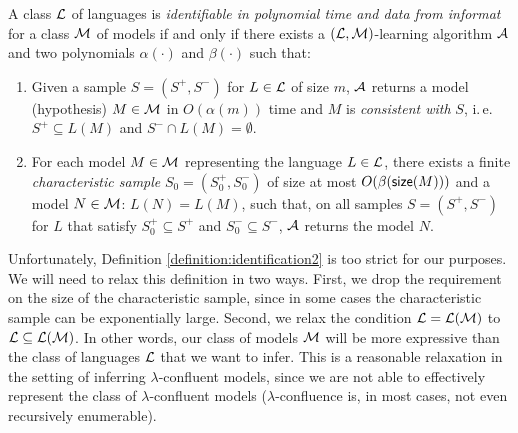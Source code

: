 \begin{definition}\label{definition:identification2}
A class $\textup{\sf $\mathcal{L}$}$ of languages is \emph{identifiable in polynomial time and data from informat} for a class $\textup{\sf $\mathcal{M}$}$ of models if and only if there exists a $(\textup{\sf $\mathcal{L}$}, \textup{\sf $\mathcal{M}$})$-learning algorithm $\textup{\sf $\mathcal{A}$}$ and two polynomials $\alpha(\cdot)$ and $\beta(\cdot)$ such that:
\begin{enumerate}
\item\label{polynomial1} Given a sample $S = (S^+, S^-)$ for $L \in \textup{\sf $\mathcal{L}$}$ of size $m$, $\textup{\sf $\mathcal{A}$}$ returns a model (hypothesis) $M \in \textup{\sf $\mathcal{M}$}$ in $O(\alpha(m))$ time and $M$ is \emph{consistent with} $S$, i.\,e.\ $S^+ \subseteq L(M)$ and $S^- \cap L(M) = \emptyset$.

\item\label{polynomial2} For each model $M \in \textup{\sf $\mathcal{M}$}$ representing the language $L \in \textup{\sf $\mathcal{L}$}$, there exists a finite \emph{characteristic sample} $S_0 = (S_0^+, S_0^-)$ of size at most $O(\beta(\textup{\sf size}(M)))$ and a model $N \in \textup{\sf $\mathcal{M}$}$: $L(N) = L(M)$, such that, on all samples $S = (S^+, S^-)$ for $L$ that satisfy $S_0^+ \subseteq S^+$ and $S_0^- \subseteq S^-$, $\textup{\sf $\mathcal{A}$}$ returns the model $N$.
\end{enumerate}
\end{definition}

Unfortunately, Definition \ref{definition:identification2} is too strict for our purposes. We will need to relax this definition in two ways. First, we drop the requirement on the size of the characteristic sample, since in some cases the characteristic sample can be exponentially large. Second, we relax the condition $\textup{\sf $\mathcal{L}$} = {\cal L}(\textup{\sf $\mathcal{M}$})$ to $\textup{\sf $\mathcal{L}$} \subseteq {\cal L}(\textup{\sf $\mathcal{M}$})$. In other words, our class of models $\textup{\sf $\mathcal{M}$}$ will be more expressive than the class of languages $\textup{\sf $\mathcal{L}$}$ that we want to infer. This is a reasonable relaxation in the setting of inferring $\lambda$-confluent models, since we are not able to effectively represent the class of $\lambda$-confluent models ($\lambda$-confluence is, in most cases, not even recursively enumerable).

